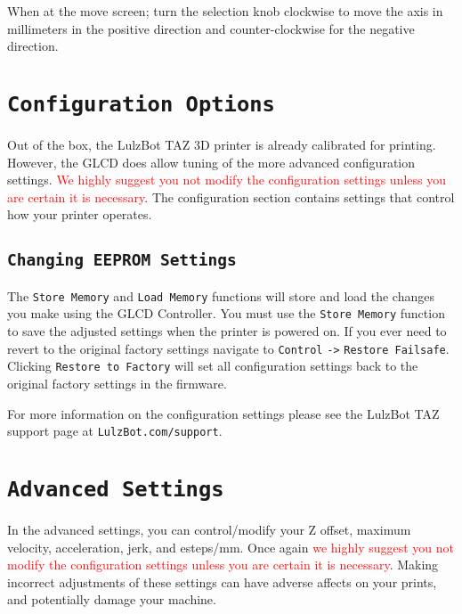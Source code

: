 When at the move screen; turn the selection knob clockwise to move the axis in millimeters in the positive direction and counter-clockwise for the negative direction. 

\section{\texttt{Configuration Options}} 


Out of the box, the LulzBot TAZ 3D printer is already calibrated for printing. However, the GLCD does allow tuning of the more advanced configuration settings. \textcolor{red}{We highly suggest you not modify the configuration settings unless you are certain it is necessary}. The configuration section contains settings that control how your printer operates.

\subsection{\texttt{Changing EEPROM Settings}}
The \texttt{Store Memory} and \texttt{Load Memory} functions will store and load the changes you make using the GLCD Controller. You must use the \texttt{Store Memory} function to save the adjusted settings when the printer is powered on. If you ever need to revert to the original factory settings navigate to \texttt{Control} \texttt{->} \texttt{Restore Failsafe}. Clicking \texttt{Restore to Factory} will set all configuration settings back to the original factory settings in the firmware.

For more information on the configuration settings please see the LulzBot TAZ support page at \texttt{LulzBot.com/support}.

\section{\texttt{Advanced Settings}}
In the advanced settings, you can control/modify your Z offset, maximum velocity, acceleration, jerk, and esteps/mm. Once again \textcolor{red}{we highly suggest you not modify the configuration settings unless you are certain it is necessary}. Making incorrect adjustments of these settings can have adverse affects on your prints, and potentially damage your machine.

